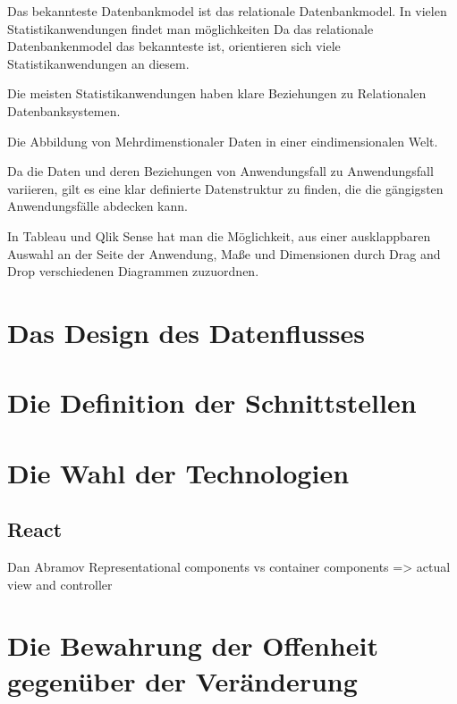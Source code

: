 Das bekannteste Datenbankmodel ist das relationale Datenbankmodel. In vielen Statistikanwendungen findet
man möglichkeiten
Da das relationale Datenbankenmodel das bekannteste ist, orientieren sich viele Statistikanwendungen an diesem.

Die meisten Statistikanwendungen haben klare Beziehungen zu Relationalen Datenbanksystemen. 

Die Abbildung von Mehrdimenstionaler Daten in einer eindimensionalen Welt.




Da die Daten und deren Beziehungen von Anwendungsfall zu Anwendungsfall
variieren, gilt es eine klar definierte Datenstruktur zu finden, die
die gängigsten Anwendungsfälle abdecken kann. 




In Tableau und Qlik Sense hat man die Möglichkeit, aus einer ausklappbaren Auswahl an der Seite der
Anwendung, Maße und Dimensionen durch Drag and Drop verschiedenen Diagrammen zuzuordnen. 

\section{Das Design des Datenflusses}
\label{sec:das-design-des-datenflusses}

\section{Die Definition der Schnittstellen}
\label{sec:die-definition-der-schnittstellen}

\section{Die Wahl der Technologien}

\subsection{React}
Dan Abramov Representational components vs container components => actual view and controller


\section{Die Bewahrung der Offenheit gegenüber der Veränderung}
\label{sec:die-bewahrung-der-offenheit-gegenueber-der-veraenderung}

